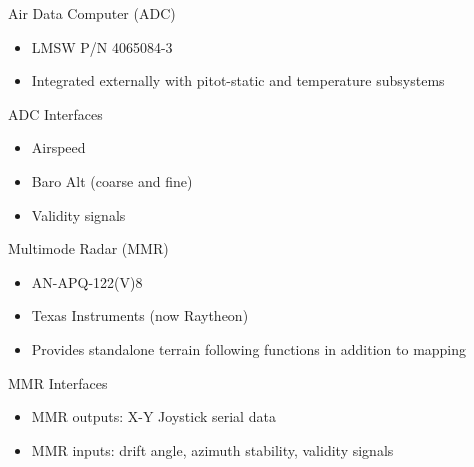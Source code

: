 \begin{frame}
Air Data Computer (ADC)
\begin{itemize}
  \item LMSW P/N 4065084-3
  \item Integrated externally with pitot-static and temperature subsystems
\end{itemize} 
\end{frame}

\begin{frame}
ADC Interfaces
\begin{itemize}
  \item Airspeed
  \item Baro Alt (coarse and fine)
  \item Validity signals
\end{itemize} 
\end{frame}

\begin{frame}
Multimode Radar (MMR)
\begin{itemize}
  \item AN-APQ-122(V)8
  \item Texas Instruments (now Raytheon)
  \item Provides standalone terrain following functions in addition to mapping
\end{itemize} 
\end{frame}

\begin{frame}
MMR Interfaces
\begin{itemize}
  \item MMR outputs: X-Y Joystick serial data
  \item MMR inputs: drift angle, azimuth stability, validity signals 
\end{itemize} 
\end{frame}

